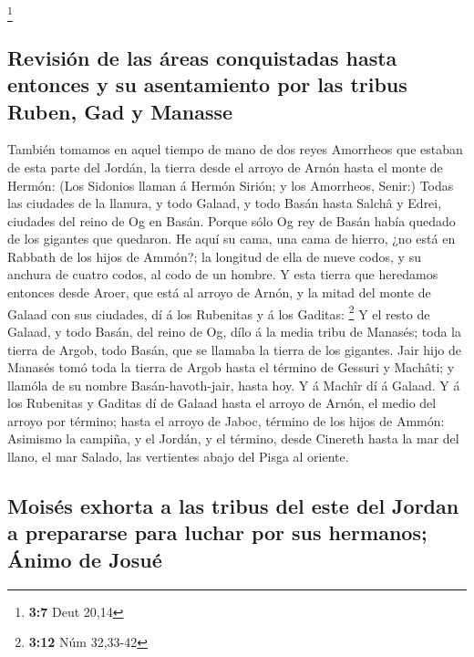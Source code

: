 \footnote{\textbf{3:7} Deut 20,14}

\hypertarget{revisiuxf3n-de-las-uxe1reas-conquistadas-hasta-entonces-y-su-asentamiento-por-las-tribus-ruben-gad-y-manasse}{%
\subsection{Revisión de las áreas conquistadas hasta entonces y su
asentamiento por las tribus Ruben, Gad y
Manasse}\label{revisiuxf3n-de-las-uxe1reas-conquistadas-hasta-entonces-y-su-asentamiento-por-las-tribus-ruben-gad-y-manasse}}

 También tomamos en aquel tiempo de mano de dos reyes
Amorrheos que estaban de esta parte del Jordán, la tierra desde el
arroyo de Arnón hasta el monte de Hermón:  (Los Sidonios
llaman á Hermón Sirión; y los Amorrheos, Senir:)  Todas las
ciudades de la llanura, y todo Galaad, y todo Basán hasta Salchâ y
Edrei, ciudades del reino de Og en Basán.  Porque sólo Og
rey de Basán había quedado de los gigantes que quedaron. He aquí su
cama, una cama de hierro, ¿no está en Rabbath de los hijos de Ammón?; la
longitud de ella de nueve codos, y su anchura de cuatro codos, al codo
de un hombre.  Y esta tierra que heredamos entonces desde
Aroer, que está al arroyo de Arnón, y la mitad del monte de Galaad con
sus ciudades, dí á los Rubenitas y á los Gaditas: \footnote{\textbf{3:12}
  Núm 32,33-42}  Y el resto de Galaad, y todo Basán, del
reino de Og, dílo á la media tribu de Manasés; toda la tierra de Argob,
todo Basán, que se llamaba la tierra de los gigantes.  Jair
hijo de Manasés tomó toda la tierra de Argob hasta el término de Gessuri
y Machâti; y llamóla de su nombre Basán-havoth-jair, hasta hoy.
 Y á Machîr dí á Galaad.  Y á los Rubenitas y
Gaditas dí de Galaad hasta el arroyo de Arnón, el medio del arroyo por
término; hasta el arroyo de Jaboc, término de los hijos de Ammón:
 Asimismo la campiña, y el Jordán, y el término, desde
Cinereth hasta la mar del llano, el mar Salado, las vertientes abajo del
Pisga al oriente.

\hypertarget{moisuxe9s-exhorta-a-las-tribus-del-este-del-jordan-a-prepararse-para-luchar-por-sus-hermanos-uxe1nimo-de-josuuxe9}{%
\subsection{Moisés exhorta a las tribus del este del Jordan a prepararse
para luchar por sus hermanos; Ánimo de
Josué}\label{moisuxe9s-exhorta-a-las-tribus-del-este-del-jordan-a-prepararse-para-luchar-por-sus-hermanos-uxe1nimo-de-josuuxe9}}

